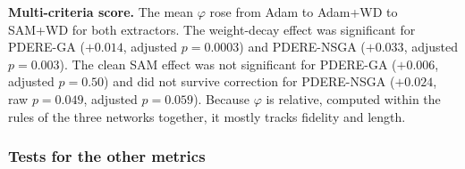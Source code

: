 \textbf{Multi-criteria score.} The mean $\varphi$ rose from Adam to Adam+WD to SAM+WD for both extractors. The weight-decay effect was significant for PDERE-GA ($+0.014$, adjusted $p = 0.0003$) and PDERE-NSGA ($+0.033$, adjusted $p = 0.003$). The clean SAM effect was not significant for PDERE-GA ($+0.006$, adjusted $p = 0.50$) and did not survive correction for PDERE-NSGA ($+0.024$, raw $p = 0.049$, adjusted $p = 0.059$). Because $\varphi$ is relative, computed within the rules of the three networks together, it mostly tracks fidelity and length.

\subsubsection{Tests for the other metrics}
\label{sec:all-tests}


